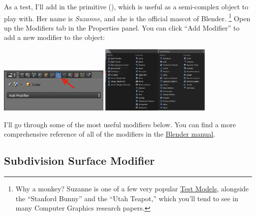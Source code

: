 \documentclass[11pt]{article}
\begin{document}
As a test, I'll add in the  primitive (), which is useful as a
semi-complex object to play with.  Her name is \textit{Suzanne}, and she is
the official mascot of Blender.  \footnote{Why a monkey?  Suzanne is one of a few very popular 
\href{https://en.wikipedia.org/wiki/List_of_common_3D_test_models}{Test Models}, alongside the
``Stanford Bunny'' and the ``Utah Teapot,'' which you'll tend to see in many Computer Graphics
research papers.}  Open up the Modifiers tab in the Properties panel.  You can click ``Add 
Modifier'' to add a new modifier to the object:
\begin{center}
    \includegraphics[width=0.4\textwidth]{modifier-panel-1} \includegraphics[width=0.4\textwidth]{modifier-panel-2}
\end{center}
I'll go through some of the most useful modifiers below.  You can find a more comprehensive 
reference of all of the modifiers in the 
\href{https://docs.blender.org/manual/en/latest/modeling/modifiers/index.html}{Blender manual}.

\subsection{Subdivision Surface Modifier}
\end{document}
